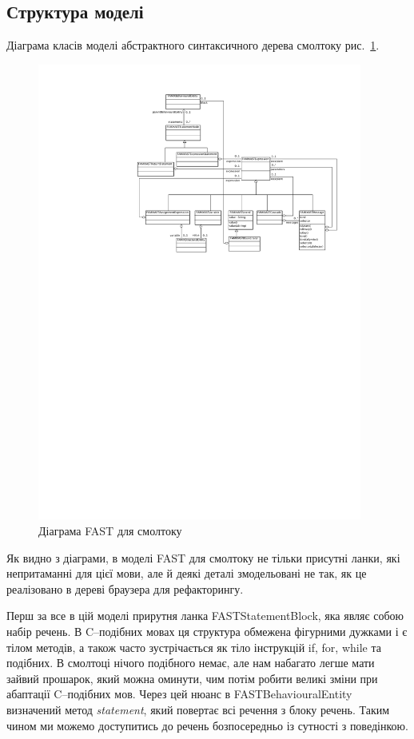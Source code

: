 \documentclass[12pt,a4paper]{article}
\begin{document}
\subsection{Структура моделі}

Діаграма класів моделі абстрактного синтаксичного дерева смолтоку рис.~\ref{smtFast}.

\begin{figure}[h]
  \centering
    \includegraphics[width=0.95\textwidth]{SmalltalkASTClassDiagram}
  \caption{Діаграма FAST для смолтоку\label{smtFast}}
\end{figure}

Як видно з діаграми, в моделі FAST для смолтоку не тільки присутні ланки, які непритаманні для цієї мови, але й деякі деталі змодельовані не так, як це реалізовано в дереві браузера для рефакторингу.

Перш за все в цій моделі прирутня ланка FASTStatementBlock, яка являє собою набір речень. В C--подібних мовах ця структура обмежена фігурними дужками і є тілом методів, а також часто зустрічається як тіло інструкцій if, for, while та подібних. В смолтоці нічого подібного немає, але нам набагато легше мати зайвий прошарок, який можна оминути, чим потім робити великі зміни при абаптації C--подібних мов. Через цей нюанс в FASTBehaviouralEntity визначений метод \emph{statement}, який повертає всі речення з блоку речень. Таким чином ми можемо доступитись до речень бозпосередньо із сутності з поведінкою.
\end{document}
